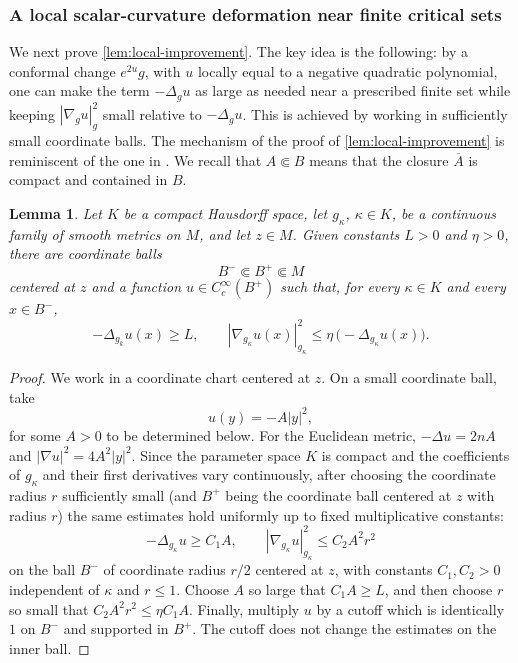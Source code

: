 \documentclass[11pt]{amsart}
\numberwithin{equation}{section}
\newtheorem{lemma}[theorem]{Lemma}
\let\geq\geqslant
\let\leq\leqslant
\begin{document}
\subsubsection{A local scalar-curvature deformation near finite critical sets}\label{sec:local-scalar}


We next prove \cref{lem:local-improvement}.
The key idea is the following: by a conformal change $e^{2u}g$, with $u$ locally equal to a negative quadratic polynomial, one can make the term $-\Delta_g u$ as large as needed near a prescribed finite set while keeping $|\nabla_g u|_g^2$ small relative to $-\Delta_g u$.
This is achieved by working in sufficiently small coordinate balls.
The mechanism of the proof of \cref{lem:local-improvement} is reminiscent of the one in \cite[Lemma 2.5]{BaerHankeLocalFlexibility}. 
We recall that $A\Subset B$ means that the closure $\overline A$ is compact and contained in $B$.

\begin{lemma}\label{lem:local-bump}
Let $K$ be a compact Hausdorff space, let $g_\kappa$,  $\kappa\in K$, be a continuous family of smooth metrics
on $M$, and let $z\in M$. Given constants $L>0$ and $\eta>0$, there are coordinate balls
\[
 B^-\Subset B^+\Subset M
\]
centered at $z$ and a function $u\in C_c^\infty(B^+)$ such that, for every $\kappa\in K$ and every
$x\in B^-$,
\begin{equation}\label{eq:bump-estimates}
 -\Delta_{g_k}u(x)\geq L,
 \qquad
 |\nabla_{g_\kappa}u(x)|_{g_\kappa}^2\leq \eta\,\bigl(-\Delta_{g_\kappa}u(x)\bigr).
\end{equation}
\end{lemma}

\begin{proof}
We work in a coordinate chart centered at $z$. On a small coordinate ball, take
\[
 u(y)=-A|y|^2,
\]
for some $A>0$ to be determined below.
For the Euclidean metric, $-\Delta u=2nA$ and $|\nabla u|^2=4A^2|y|^2$.
Since the parameter space $K$ is compact and the coefficients of $g_\kappa$ and their first derivatives vary continuously, after choosing the
coordinate radius $r$ sufficiently small (and $B^+$ being the coordinate ball centered at $z$ with radius $r$) the same estimates hold uniformly up to fixed multiplicative
constants:
\[
 -\Delta_{g_\kappa}u\geq C_1A,
 \qquad
 |\nabla_{g_\kappa}u|_{g_\kappa}^2\leq C_2A^2r^2
\]
on the ball $B^-$ of coordinate radius $r/2$ centered at $z$, with constants $C_1,C_2>0$ independent of $\kappa$ and $r\leq 1$.
Choose $A$ so large that $C_1A\geq L$, and then choose $r$ so small that $C_2A^2r^2\leq \eta C_1A$. Finally, multiply $u$ by a cutoff which is identically $1$ on $B^-$ and supported in $B^+$. 
The cutoff does not change the estimates on the inner ball.
\end{proof}
\end{document}
